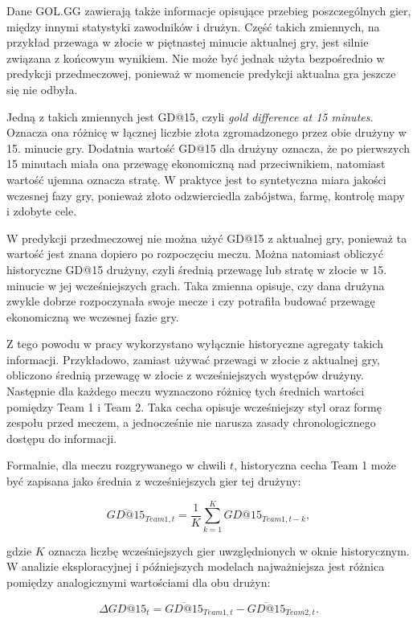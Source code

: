 Dane GOL.GG zawierają także informacje opisujące przebieg poszczególnych gier, między innymi
statystyki zawodników i drużyn. Część takich zmiennych, na przykład przewaga w złocie w piętnastej
minucie aktualnej gry, jest silnie związana z końcowym wynikiem. Nie może być jednak użyta
bezpośrednio w predykcji przedmeczowej, ponieważ w momencie predykcji aktualna gra jeszcze się nie
odbyła.

Jedną z takich zmiennych jest GD@15, czyli \textit{gold difference at 15 minutes}. Oznacza ona
różnicę w łącznej liczbie złota zgromadzonego przez obie drużyny w 15. minucie gry. Dodatnia wartość
GD@15 dla drużyny oznacza, że po pierwszych 15 minutach miała ona przewagę ekonomiczną nad
przeciwnikiem, natomiast wartość ujemna oznacza stratę. W praktyce jest to syntetyczna miara jakości
wczesnej fazy gry, ponieważ złoto odzwierciedla zabójstwa, farmę, kontrolę mapy i zdobyte cele.

W predykcji przedmeczowej nie można użyć GD@15 z aktualnej gry, ponieważ ta wartość jest znana
dopiero po rozpoczęciu meczu. Można natomiast obliczyć historyczne GD@15 drużyny, czyli średnią
przewagę lub stratę w złocie w 15. minucie w jej wcześniejszych grach. Taka zmienna opisuje, czy
dana drużyna zwykle dobrze rozpoczynała swoje mecze i czy potrafiła budować przewagę ekonomiczną we
wczesnej fazie gry.

Z tego powodu w pracy wykorzystano wyłącznie historyczne agregaty takich informacji. Przykładowo,
zamiast używać przewagi w złocie z aktualnej gry, obliczono średnią przewagę w złocie z
wcześniejszych występów drużyny. Następnie dla każdego meczu wyznaczono różnicę tych średnich
wartości pomiędzy Team 1 i Team 2. Taka cecha opisuje wcześniejszy styl oraz formę zespołu przed
meczem, a jednocześnie nie narusza zasady chronologicznego dostępu do informacji.

Formalnie, dla meczu rozgrywanego w chwili \(t\), historyczna cecha Team 1 może być zapisana jako
średnia z wcześniejszych gier tej drużyny:

\begin{equation}
    \overline{GD@15}_{Team1,t} = \frac{1}{K}\sum_{k=1}^{K} GD@15_{Team1,t-k},
\end{equation}

gdzie \(K\) oznacza liczbę wcześniejszych gier uwzględnionych w oknie historycznym. W analizie
eksploracyjnej i późniejszych modelach najważniejsza jest różnica pomiędzy analogicznymi wartościami
dla obu drużyn:

\begin{equation}
    \Delta GD@15_t = \overline{GD@15}_{Team1,t} - \overline{GD@15}_{Team2,t}.
\end{equation}

